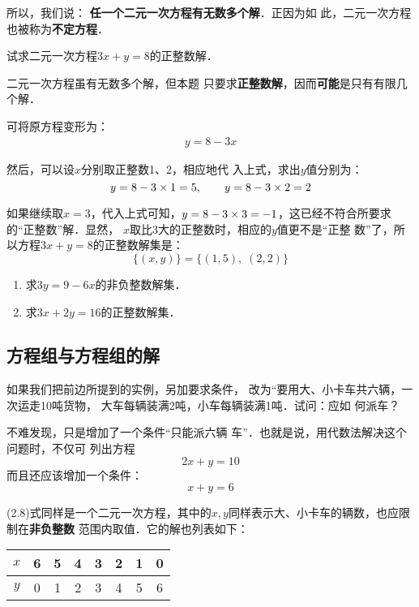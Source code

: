 所以，我们说：
\textbf{任一个二元一次方程有无数多个解}．正因为如
此，二元一次方程也被称为\textbf{不定方程}．

\begin{example}
    试求二元一次方程$3x +y=8$的正整数解．
\end{example}

\begin{analyze}
    二元一次方程虽有无数多个解，但本题
只要求\textbf{正整数解}，因而\textbf{可能}是只有有限几个解．
\end{analyze}

\begin{solution}
可将原方程变形为：
\begin{align*}
    y=8-3x   \tag{移项变号}
\end{align*}

  然后，可以设$x$分别取正整数1、2，相应地代
入上式，求出$y$值分别为：
\[y=8-3\times1=5, \qquad  y=8-3\times 2=2\]

    如果继续取$x=3$，代入上式可知，$y=8-3\times3=-1$，这已经不符合所要求的“正整数”解．显然，
$x$取比3大的正整数时，相应的$y$值更不是“正整
数”了，所以方程$3x +y=8$的正整数解集是：
\[\{(x,y)\}=\{(1,5),\; (2,2)\}  \]

\end{solution}

\begin{ex}
\begin{enumerate}
    \item 求$3y=9-6x$的非负整数解集．
    \item 求$3x+2y=16$的正整数解集．
\end{enumerate}
\end{ex}
          
\subsection{方程组与方程组的解}
    如果我们把前边所提到的实例，另加要求条件，
改为“要用大、小卡车共六辆，一次运走10吨货物，
大车每辆装满2吨，小车每辆装满1吨．试问：应如
何派车？

    不难发现，只是增加了一个条件“只能派六辆
车”．也就是说，用代数法解决这个问题时，不仅可
列出方程
\begin{equation}
    2x+y=10
\end{equation}
而且还应该增加一个条件：
\begin{equation}
    x+y=6
\end{equation}

(2.8)式同样是一个二元一次方程，其中的$x,y$同样表示大、小卡车的辆数，也应限制在\textbf{非负整数}
范围内取值．它的解也列表如下：
\begin{center}
    \begin{tabular}{c|ccccccc}
        \hline
$x$ &6&5&4&3&2&1&0\\
\hline
$y$ &0&1&2&3&4&5&6 \\
\hline      
    \end{tabular}
\end{center}

